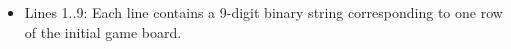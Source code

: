 \begin{itemize}
	\item      Lines 1..9: Each line contains a 9-digit binary string corresponding         to one row of the initial game board.    
\end{itemize}
